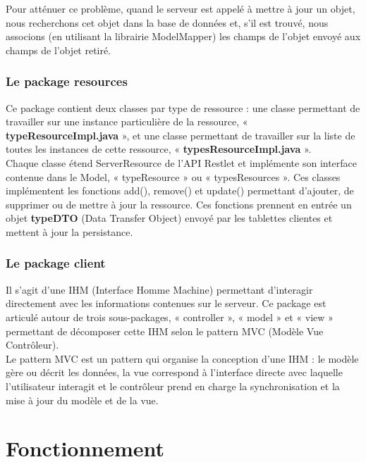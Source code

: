 \documentclass{article}
\begin{document}
Pour atténuer ce problème, quand le serveur est appelé à mettre à jour un objet, nous recherchons cet objet dans la base de données et, s’il est trouvé, nous associons (en utilisant la librairie ModelMapper) les champs de l’objet envoyé aux champs de l’objet retiré.\\


\subsubsection{Le package resources}

Ce package contient deux classes par type de ressource : une classe permettant de travailler sur une instance particulière de la ressource, « \textbf{typeResourceImpl.java} », et une classe permettant de travailler sur la liste de toutes les instances de cette ressource, « \textbf{typesResourceImpl.java} ».\\


Chaque classe étend ServerResource de l'API Restlet et implémente son interface contenue dans le Model, « typeResource » ou « typesResources ». Ces classes implémentent les fonctions add(), remove() et update() permettant d'ajouter, de supprimer ou de mettre à jour la ressource. Ces fonctions prennent en entrée un objet \textbf{typeDTO} (Data Transfer Object) envoyé par les tablettes clientes et mettent à jour la persistance.\\


\subsubsection{Le package client}

Il s'agit d'une IHM (Interface Homme Machine) permettant d'interagir directement avec les informations contenues sur le serveur. Ce package est articulé autour de trois sous-packages, « controller », « model » et « view » permettant de décomposer cette IHM selon le pattern MVC (Modèle Vue Contrôleur).\\

Le pattern MVC est un pattern qui organise la conception d'une IHM : le modèle gère ou décrit les données, la vue correspond à l'interface directe avec laquelle l'utilisateur interagit et le contrôleur prend en charge la synchronisation et la mise à jour du modèle et de la vue.\\

\section{Fonctionnement}
\end{document}
